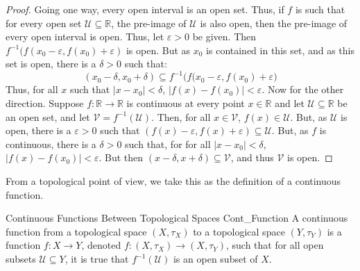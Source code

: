         \begin{proof}
            Going one way, every open interval is an open set.
            Thus, if $f$ is such that for every open set
            $\mathcal{U}\subseteq\mathbb{R}$, the pre-image of
            $\mathcal{U}$ is also open, then the pre-image of every
            open interval is open. Thus, let $\varepsilon>0$ be
            given. Then
            $f^{-1}(f(x_{0}-\varepsilon,f(x_{0})+\varepsilon)$ is
            open. But as $x_{0}$ is contained in this set, and as
            this set is open, there is a $\delta>0$ such that:
            \begin{equation}
                (x_{0}-\delta,x_{0}+\delta)\subseteq
                f^{-1}\big(
                    f(x_{0}-\varepsilon,f(x_{0})+\varepsilon\big)
            \end{equation}
            Thus, for all $x$ such that
            $|x-x_{0}|<\delta$, $|f(x)-f(x_{0})|<\varepsilon$.
            Now for the other direction. Suppose
            $f:\mathbb{R}\rightarrow\mathbb{R}$ is continuous at
            every point $x\in\mathbb{R}$ and let
            $\mathcal{U}\subseteq\mathbb{R}$ be an open set, and
            let $\mathcal{V}=f^{-1}(\mathcal{U})$. Then, for all
            $x\in\mathcal{V}$, $f(x)\in\mathcal{U}$. But, as
            $\mathcal{U}$ is open, there is a $\varepsilon>0$
            such that
            $(f(x)-\varepsilon,f(x)+\varepsilon)\subseteq\mathcal{U}$.
            But, as $f$ is continuous, there is a $\delta>0$ such
            that, for for all $|x-x_{0}|<\delta$,
            $|f(x)-f(x_{0})|<\varepsilon$. But then
            $(x-\delta,x+\delta)\subseteq\mathcal{V}$, and thus
            $\mathcal{V}$ is open.
        \end{proof}
        From a topological point of view, we take this as the
        definition of a continuous function.
        \begin{ldefinition}
              {Continuous Functions Between Topological Spaces}
              {Cont_Function}
            A continuous function from a topological space
            $(X,\tau_{X})$ to a topological space
            $(Y,\tau_{Y})$ is a function $f:X\rightarrow{Y}$,
            denoted $f:(X,\tau_{X})\rightarrow(X,\tau_{Y})$, such
            that for all open subsets $\mathcal{U}\subseteq{Y}$,
            it is true that $f^{-1}(\mathcal{U})$ is an open
            subset of $X$.
        \end{ldefinition}

